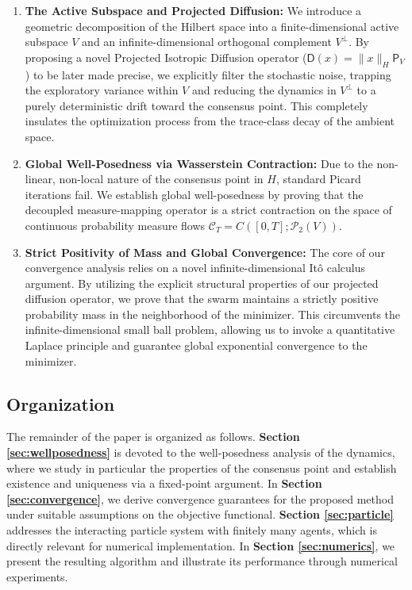 \documentclass[12pt]{amsart}
\numberwithin{equation}{section}
\begin{document}
\begin{enumerate}
    \item \textbf{The Active Subspace and Projected Diffusion:} We introduce a geometric decomposition of the Hilbert space into a finite-dimensional active subspace $V$ and an infinite-dimensional orthogonal complement $V^\perp$. By proposing a novel Projected Isotropic Diffusion operator ($\mathsf{D}(x) = \|x\|_H \mathsf{P}_V$) to be later made precise, we explicitly filter the stochastic noise, trapping the exploratory variance within $V$ and reducing the dynamics in $V^\perp$ to a purely deterministic drift toward the consensus point. This completely insulates the optimization process from the trace-class decay of the ambient space.
    
    \item \textbf{Global Well-Posedness via Wasserstein Contraction:} Due to the non-linear, non-local nature of the consensus point in $H$, standard Picard iterations fail. We establish global well-posedness by proving that the decoupled measure-mapping operator is a strict contraction on the space of continuous probability measure flows $\mathscr{C}_T = C([0,T]; \mathscr{P}_2(V))$.
    
    \item \textbf{Strict Positivity of Mass and Global Convergence:} The core of our convergence analysis relies on a novel infinite-dimensional It\^o calculus argument. By utilizing the explicit structural properties of our projected diffusion operator, we prove that the swarm maintains a strictly positive probability mass in the neighborhood of the minimizer. This circumvents the infinite-dimensional small ball problem, allowing us to invoke a quantitative Laplace principle and guarantee global exponential convergence to the minimizer.
\end{enumerate}


\subsection{Organization}

The remainder of the paper is organized as follows. 
\textbf{Section \ref{sec:wellposedness}} is devoted to the well-posedness analysis of the dynamics, where we study in particular the properties of the consensus point and establish existence and uniqueness via a fixed-point argument. In \textbf{Section \ref{sec:convergence}}, we derive convergence guarantees for the proposed method under suitable assumptions on the objective functional. \textbf{Section \ref{sec:particle}} addresses the interacting particle system with finitely many agents, which is directly relevant for numerical implementation. In \textbf{Section \ref{sec:numerics}}, we present the resulting algorithm and illustrate its performance through numerical experiments.
\end{document}
